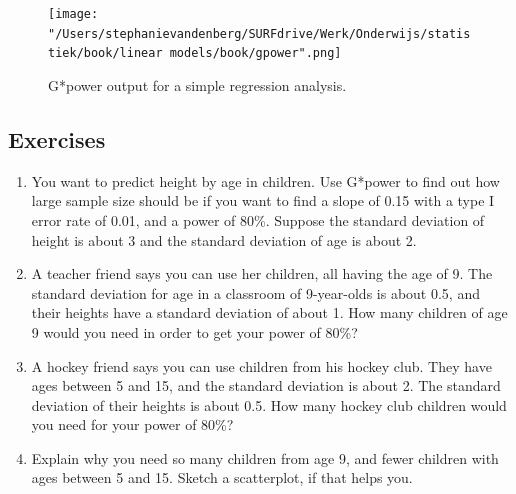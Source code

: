 \documentclass[]{book}\usepackage[]{graphicx}\usepackage[]{color}
\begin{document}
\begin{figure}[h]
    \begin{center}
       \texttt{[image: "/Users/stephanievandenberg/SURFdrive/Werk/Onderwijs/statistiek/book/linear models/book/gpower".png]}
    \end{center}
    \caption{G*power output for a simple regression analysis.}
    \label{fig:gpower}
\end{figure}



\subsection{Exercises}


\begin{enumerate}

\item You want to predict height by age in children. Use G*power to find out how large sample size should be if you want to find a slope of 0.15 with a type I error rate of 0.01, and a power of 80\%. Suppose the standard deviation of height is about 3 and the standard deviation of age is about 2.

\item A teacher friend says you can use her children, all having the age of 9. The standard deviation for age in a classroom of 9-year-olds is about 0.5, and their heights have a standard deviation of about 1. How many children of age 9 would you need in order to get your power of 80\%?

\item A hockey friend says you can use children from his hockey club. They have ages between 5 and 15, and the standard deviation is about 2. The standard deviation of their heights is about 0.5. How many hockey club children would you need for your power of 80\%?

\item Explain why you need so many children from age 9, and fewer children with ages between 5 and 15. Sketch a scatterplot, if that helps you.


\end{enumerate}
\end{document}
